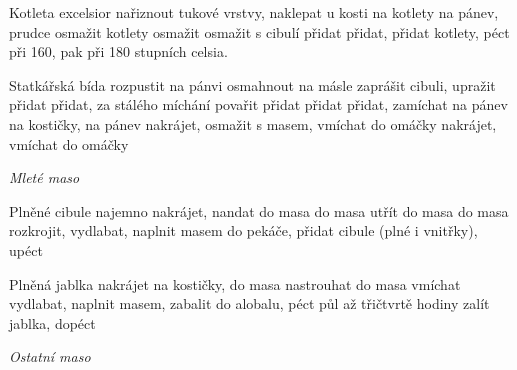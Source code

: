 \documentclass[12pt,a4paper]{article}
\begin{document}
\begin{recipe}{Kotleta excelsior}
   nařiznout tukové vrstvy, naklepat u kosti
   na kotlety
   na pánev, prudce osmažit kotlety
   osmažit
   osmažit s cibulí
   přidat
   přidat, přidat kotlety, péct při 160, pak při 180 stupních celsia.
\end{recipe}
\newpage

\begin{recipe}{Statkářská bída}
   rozpustit na pánvi
   osmahnout na másle
   zaprášit cibuli, upražit
   přidat
   přidat, za stálého míchání povařit
   přidat
   přidat
   přidat, zamíchat
   na pánev
   na kostičky, na pánev
   nakrájet, osmažit s masem, vmíchat do omáčky
   nakrájet, vmíchat do omáčky
\end{recipe}
\newpage

\vspace*{\fill}
\hfill {\Huge\it Mleté maso}\hfill
\vspace*{\fill}
\newpage

\begin{recipe}{Plněné cibule}
   najemno nakrájet, nandat do masa
   do masa
   utřít do masa
   do masa
   rozkrojit, vydlabat, naplnit masem
   do pekáče, přidat cibule (plné i vnitřky), upéct
\end{recipe}
\newpage

\begin{recipe}{Plněná jablka}
   nakrájet na kostičky, do masa
   nastrouhat do masa
   vmíchat
   vydlabat, naplnit masem, zabalit do alobalu, péct půl až třičtvrtě hodiny
   zalít jablka, dopéct
\end{recipe}
\newpage

\vspace*{\fill}
\hfill {\Huge\it Ostatní maso}\hfill
\vspace*{\fill}
\newpage
\end{document}
